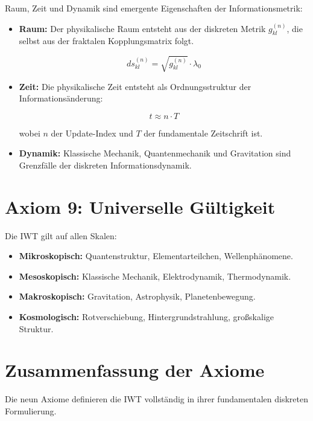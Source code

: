 Raum, Zeit und Dynamik sind emergente Eigenschaften der Informationsmetrik:

\begin{itemize}
\item \textbf{Raum:} Der physikalische Raum entsteht aus der diskreten Metrik \( g_{kl}^{(n)} \), die selbst aus der fraktalen Kopplungsmatrix folgt.

\[
ds_{kl}^{(n)} = \sqrt{g_{kl}^{(n)}} \cdot \lambda_0
\]

\item \textbf{Zeit:} Die physikalische Zeit entsteht als Ordnungsstruktur der Informationsänderung:

\[
t \approx n \cdot T
\]

wobei \( n \) der Update-Index und \( T \) der fundamentale Zeitschrift ist.

\item \textbf{Dynamik:} Klassische Mechanik, Quantenmechanik und Gravitation sind Grenzfälle der diskreten Informationsdynamik.
\end{itemize}

\section{Axiom 9: Universelle Gültigkeit}

Die IWT gilt auf allen Skalen:

\begin{itemize}
\item \textbf{Mikroskopisch:} Quantenstruktur, Elementarteilchen, Wellenphänomene.
\item \textbf{Mesoskopisch:} Klassische Mechanik, Elektrodynamik, Thermodynamik.
\item \textbf{Makroskopisch:} Gravitation, Astrophysik, Planetenbewegung.
\item \textbf{Kosmologisch:} Rotverschiebung, Hintergrundstrahlung, großskalige Struktur.
\end{itemize}

\section{Zusammenfassung der Axiome}

Die neun Axiome definieren die IWT vollständig in ihrer fundamentalen diskreten Formulierung.

